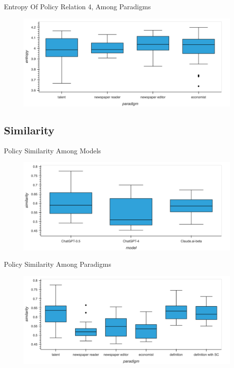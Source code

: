 \documentclass[12pt]{beamer}
\begin{document}
\begin{frame}{Entropy Of Policy Relation 4, Among Paradigms}
\begin{figure}[H]
\centering
\includegraphics[width=11.5cm]{Figures/fig22.png}
\end{figure}
\end{frame}


\subsection{Similarity}
\begin{frame}{Policy Similarity Among Models}
\begin{figure}[H]
\centering
\includegraphics[width=11.5cm]{Figures/fig23.png}
\end{figure}
\end{frame}


\begin{frame}{Policy Similarity Among Paradigms}
\begin{figure}[H]
\centering
\includegraphics[width=11.5cm]{Figures/fig24.png}
\end{figure}
\end{frame}
\end{document}
